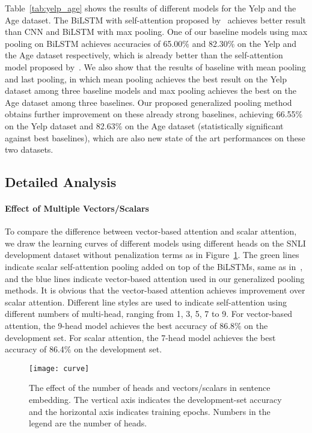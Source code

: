 \documentclass[11pt]{article}
\begin{document}
Table~\ref{tab:yelp_age} shows the results of different models for the Yelp and the Age dataset. The BiLSTM with self-attention proposed by~ achieves better result than CNN and BiLSTM with max pooling. One of our baseline models using max pooling on BiLSTM achieves accuracies of 65.00\% and 82.30\% on the Yelp and the Age dataset respectively, which is already better than the self-attention model proposed by~. We also show that the results of baseline with mean pooling and last pooling, in which mean pooling achieves the best result on the Yelp dataset among three baseline models and max pooling achieves the best on the Age dataset among three baselines. Our proposed generalized pooling method obtains further improvement on these already strong baselines, achieving 66.55\% on the Yelp dataset and 82.63\% on the Age dataset (statistically significant  against best baselines), which are also new state of the art performances on these two datasets. 

\subsection{Detailed Analysis}

\paragraph{Effect of Multiple Vectors/Scalars}
To compare the difference between vector-based attention and scalar attention, we draw the learning curves of different models using different heads on the SNLI development dataset without penalization terms as in Figure~\ref{fig:curve}. The green lines indicate scalar self-attention pooling added on top of the BiLSTMs, same as in~, and the blue lines indicate vector-based attention used in our generalized pooling methods. It is obvious that the vector-based attention achieves improvement over scalar attention. Different line styles are used to indicate self-attention using different numbers of multi-head, ranging from 1, 3, 5, 7 to 9. For vector-based attention, the 9-head model achieves the best accuracy of 86.8\% on the development set. For scalar attention, the 7-head model achieves the best accuracy of 86.4\% on the development set.

\begin{figure}[!htb]
	\centering
	\texttt{[image: curve]}
	\caption{The effect of the number of heads and vectors/scalars in sentence embedding. The vertical axis indicates the development-set accuracy and the horizontal axis indicates training epochs. Numbers in the legend are the number of heads.}
	\label{fig:curve}
\end{figure}
\end{document}
